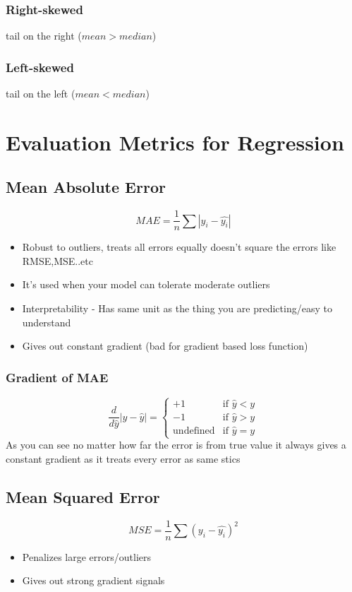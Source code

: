 \documentclass[12pt]{extarticle}
\begin{document}
\subsubsection{Right-skewed} 
tail on the right (\(mean > median\)) 

\subsubsection{Left-skewed}
tail on the left (\(mean < median\))

\section{Evaluation Metrics for Regression}

\subsection{Mean Absolute Error}  

$$MAE = \frac{1}{n}\sum{|y_i - \hat{y_i}|}$$ 
\begin{itemize}
    \item Robust to outliers, treats all errors equally doesn’t square the errors like RMSE,MSE..etc 
    \item It’s used when your model can tolerate moderate outliers  
    \item Interpretability - Has same unit as the thing you are predicting/easy to understand 
    \item Gives out constant gradient (bad for gradient based loss function) 
\end{itemize}
 
\subsubsection{Gradient of MAE} 
$$
\frac{d}{d\hat{y}}|y - \hat{y}| = 
\begin{cases} 
+1 & \text{if }  \hat{y} < y \\ 
-1 & \text{if }  \hat{y} > y \\ 
\text{undefined} & \text{if } \hat{y} = y 
\end{cases} 
$$
As you can see no matter how far the error is from true value it always gives a constant gradient as it treats every error as same
stics
\subsection{Mean Squared Error}
$$MSE = \frac{1}{n}\sum{(y_i - \hat{y_i})^2}$$ 
\begin{itemize}
    \item Penalizes large errors/outliers 
    \item Gives out strong gradient signals  
\end{itemize}
\end{document}
